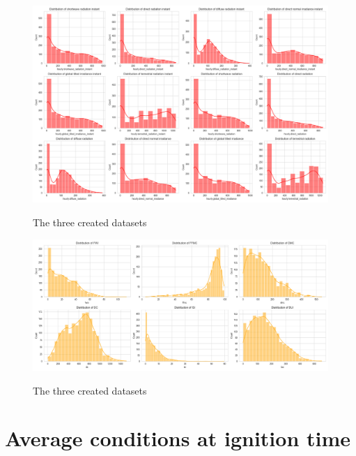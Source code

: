 \begin{figure}[H]
	\caption{The three created datasets}
	\centering
	\includegraphics[width=\textwidth]{chapter-images/5_1-eda/distribution_weather_variables2FT.png}
	\label{fig:distribuiton_weather_variables_radiation}
\end{figure}







\begin{figure}[H]
	\caption{The three created datasets}
	\centering
	\includegraphics[width=\textwidth]{chapter-images/5_1-eda/distribution_weather_variables3FT.png}
	\label{fig:montly_fire_count}
\end{figure}

\section{Average conditions at ignition time}

